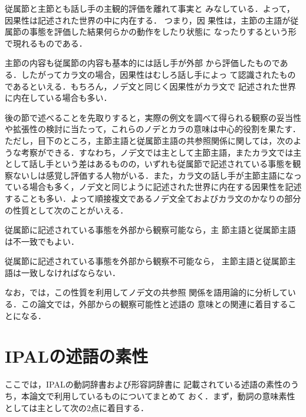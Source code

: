 \bigskip

 従属節と主節とも話し手の主観的評価を離れて事実と
みなしている．よって，因果性は記述された世界の中に内在する． つまり，因
果性は，主節の主語が従属節の事態を評価した結果何らかの動作をしたり状態に
なったりするという形で現れるものである．

 主節の内容も従属節の内容も基本的には話し手が外部
から評価したものである．したがってカラ文の場合，因果性はむしろ話し手によっ
て認識されたものであるといえる．もちろん，ノデ文と同じく因果性がカラ文で
記述された世界に内在している場合も多い．

\bigskip

後の節で述べることを先取りすると，実際の例文を調べて得られる観察の妥当性
や拡張性の検討に当たって，これらのノデとカラの意味は中心的役割を果たす．
ただし，目下のところ，主節主語と従属節主語の共参照関係に関しては，次のよ
うな考察ができる．すなわち，ノデ文では主として主節主語，またカラ文では主
として話し手という差はあるものの，いずれも従属節で記述されている事態を観
察ないしは感覚し評価する人物がいる．また，カラ文の話し手が主節主語になっ
ている場合も多く，ノデ文と同じように記述された世界に内在する因果性を記述
することも多い．よって順接複文であるノデ文全ておよびカラ文のかなりの部分
の性質として次のことがいえる．

\bigskip

 従属節に記述されている事態を外部から観察可能なら，主
節主語と従属節主語は不一致でもよい．

 従属節に記述されている事態を外部から観察不可能なら，
主節主語と従属節主語は一致しなければならない．

\bigskip

なお，\cite{中川動機95,中川ので95}では，この性質を利用してノデ文の共参照
関係を語用論的に分析している．この論文では，外部からの観察可能性と述語の
意味との関連に着目することになる．


\section{IPALの述語の素性}\label{section3}

ここでは，IPALの動詞辞書\cite{IPALverb}および形容詞辞書\cite{IPALadj}に
記載されている述語の素性のうち，本論文で利用しているものについてまとめて
おく．まず，動詞の意味素性としては主として次の2点に着目する．

